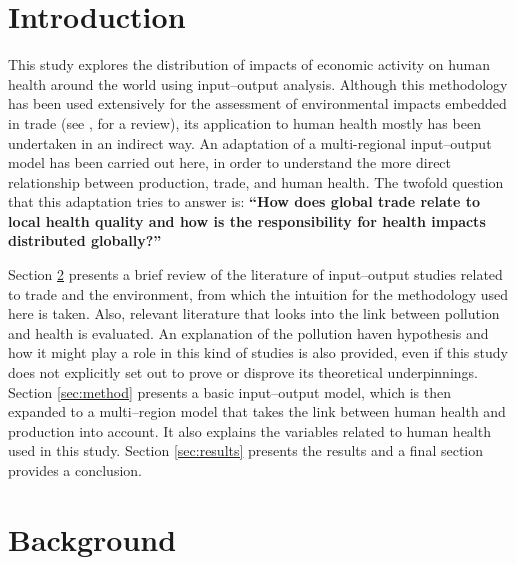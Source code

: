 \documentclass[a4paper,12pt]{article}
\begin{document}
\section{Introduction}


This study explores the distribution of impacts of economic activity on human health around the world using input--output analysis. Although this methodology has been used extensively for the assessment of environmental impacts embedded in trade (see \citealp{wiedmannexamining2007}, for a review), its application to human health mostly has been undertaken in an indirect way. An adaptation of a multi-regional input--output model has been carried out here, in order to understand the more direct relationship between production, trade, and human health. The twofold question that this adaptation tries to answer is: \textbf{``How does global trade relate to local health quality and how is the responsibility for health impacts distributed globally?''}

Section \ref{sec:bg} presents a brief review of the literature of input--output studies related to trade and the environment, from which the intuition for the methodology used here is taken. Also, relevant literature that looks into the link between pollution and health is evaluated. An explanation of the pollution haven hypothesis and how it might play a role in this kind of studies is also provided, even if this study does not explicitly set out to prove or disprove its theoretical underpinnings. Section \ref{sec:method} presents a basic input--output model, which is then expanded to a multi--region model that takes the link between human health and production into account. It also explains the variables related to human health used in this study. Section \ref{sec:results} presents the results and a final section provides a conclusion.


\section{Background}
\label{sec:bg}

\end{document}
